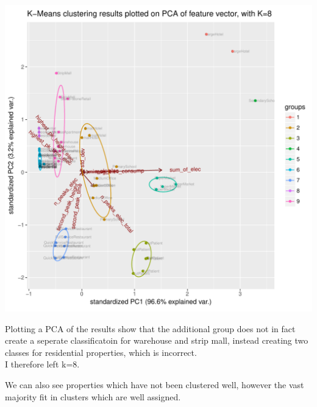 \documentclass[12pt]{article}\usepackage[]{graphicx}\usepackage[]{color}
\makeatletter
\def\maxwidth{ %
  \ifdim\Gin@nat@width>\linewidth
    \linewidth
  \else
    \Gin@nat@width
  \fi
}
\newenvironment{knitrout}{}{} %
\makeatother
\begin{document}
\begin{knitrout}
\color{fgcolor}
\includegraphics[width=\maxwidth]{figure/pca_plot_3-1} 

\end{knitrout}

Plotting a PCA of the results show that the additional group does not in fact create a seperate classificatoin for warehouse and strip mall, instead creating two classes for residential properties, which is incorrect. \\

I therefore left k=8.



We can also see properties which have not been clustered well, however the vast majority fit in clusters which are well assigned. 
\end{document}
